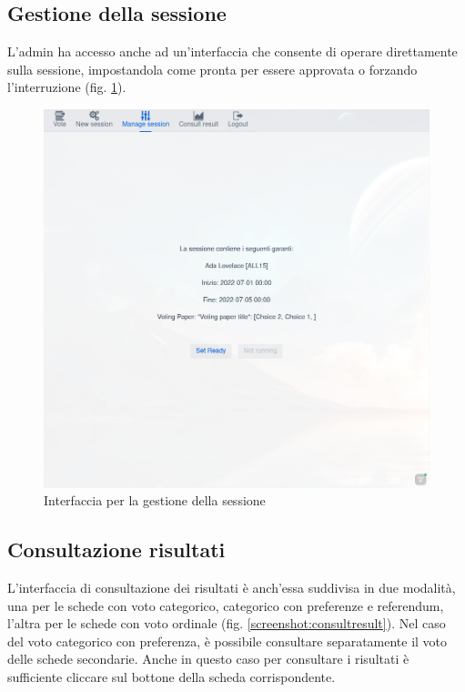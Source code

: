 \subsection{Gestione della sessione}
L'admin ha accesso anche ad un'interfaccia che consente di operare direttamente sulla sessione, impostandola come pronta per essere approvata o forzando l'interruzione (fig. \ref{screenshot:sessionmanagement}).
\begin{figure}
	\centering
	\includegraphics[width=\textwidth]{img/gui/sessionManagement.png}
	\caption{Interfaccia per la gestione della sessione}
	\label{screenshot:sessionmanagement}
\end{figure}

\subsection{Consultazione risultati}
L'interfaccia di consultazione dei risultati è anch'essa suddivisa in due modalità, una per le schede con voto categorico, categorico con preferenze e referendum, l'altra per le schede con voto ordinale (fig. \ref{screenshot:consultresult}). Nel caso del voto categorico con preferenza, è possibile consultare separatamente il voto delle schede secondarie.
Anche in questo caso per consultare i risultati è sufficiente cliccare sul bottone della scheda corrispondente.

